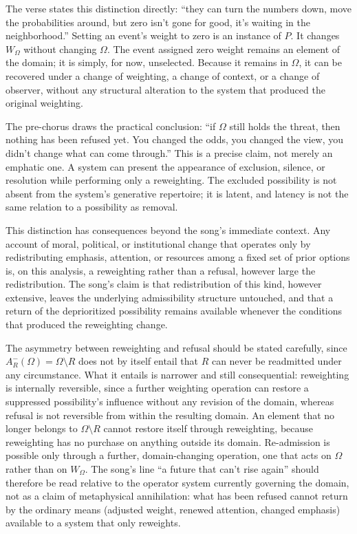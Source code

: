 \documentclass[11pt]{article}
\begin{document}
The verse states this distinction directly: ``they can turn the numbers down, move the probabilities around, but zero isn't gone for good, it's waiting in the neighborhood.'' Setting an event's weight to zero is an instance of $P$. It changes $W_\Omega$ without changing $\Omega$. The event assigned zero weight remains an element of the domain; it is simply, for now, unselected. Because it remains in $\Omega$, it can be recovered under a change of weighting, a change of context, or a change of observer, without any structural alteration to the system that produced the original weighting.

The pre-chorus draws the practical conclusion: ``if $\Omega$ still holds the threat, then nothing has been refused yet. You changed the odds, you changed the view, you didn't change what can come through.'' This is a precise claim, not merely an emphatic one. A system can present the appearance of exclusion, silence, or resolution while performing only a reweighting. The excluded possibility is not absent from the system's generative repertoire; it is latent, and latency is not the same relation to a possibility as removal.

This distinction has consequences beyond the song's immediate context. Any account of moral, political, or institutional change that operates only by redistributing emphasis, attention, or resources among a fixed set of prior options is, on this analysis, a reweighting rather than a refusal, however large the redistribution. The song's claim is that redistribution of this kind, however extensive, leaves the underlying admissibility structure untouched, and that a return of the deprioritized possibility remains available whenever the conditions that produced the reweighting change.

The asymmetry between reweighting and refusal should be stated carefully, since $A^-_R(\Omega) = \Omega \setminus R$ does not by itself entail that $R$ can never be readmitted under any circumstance. What it entails is narrower and still consequential: reweighting is internally reversible, since a further weighting operation can restore a suppressed possibility's influence without any revision of the domain, whereas refusal is not reversible from within the resulting domain. An element that no longer belongs to $\Omega \setminus R$ cannot restore itself through reweighting, because reweighting has no purchase on anything outside its domain. Re-admission is possible only through a further, domain-changing operation, one that acts on $\Omega$ rather than on $W_\Omega$. The song's line ``a future that can't rise again'' should therefore be read relative to the operator system currently governing the domain, not as a claim of metaphysical annihilation: what has been refused cannot return by the ordinary means (adjusted weight, renewed attention, changed emphasis) available to a system that only reweights.
\end{document}
